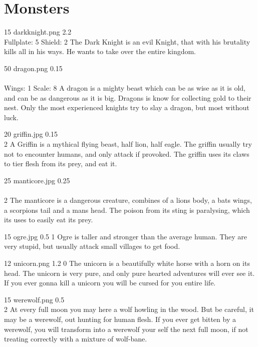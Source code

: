 \chapter{Monsters}

{15}
{}
{darkknight.png}
{2.2}
{\\
}
{Fullplate: 5 Shield: 2}
{The Dark Knight is an evil Knight, that with his brutality kills all in his ways.
He wants to take over the entire kingdom.}

{50}
{}
{dragon.png}
{0.15}
{\\
\\
}
{Wings: 1 Scale: 8}
{A dragon is a mighty beast which can be as wise as it is old, and can be as dangerous as it is big.
Dragons is know for collecting gold to their nest.
Only the most experienced knights try to slay a dragon, but most without luck.
}

{20}
{}
{griffin.jpg}
{0.15}
{\\
}
{2}
{A Griffin is a mythical flying beast, half lion, half eagle.
The griffin usually try not to encounter humans, and only attack if provoked.
The griffin uses its claws to tier flesh from its prey, and eat it.}

{25}
{}
{manticore.jpg}
{0.25}
{\\
\\
}
{2}
{The manticore is a dangerous creature, combines of a lions body, a bats wings, a scorpions tail and a mans head.
The poison from its sting is paralysing, which its uses to easily eat its prey.}

{15}
{}
{ogre.jpg}
{0.5}
{}
{1}
{Ogre is taller and stronger than the average human.
They are very stupid, but usually attack small villages to get food.}

{12}
{}
{unicorn.png}
{1.2}
{}
{0}
{The unicorn is a beautifully white horse with a horn on its head.
The unicorn is very pure, and only pure hearted adventures will ever see it.
If you ever gonna kill a unicorn you will be cursed for you entire life.}

{15}
{}
{werewolf.png}
{0.5}
{\\
}
{2}
{At every full moon you may here a wolf howling in the wood.
But be careful, it may be a werewolf, out hunting for human flesh.
If you ever get bitten by a werewolf, you will transform into a werewolf your self the next full moon, if not treating correctly with a mixture of wolf-bane.}